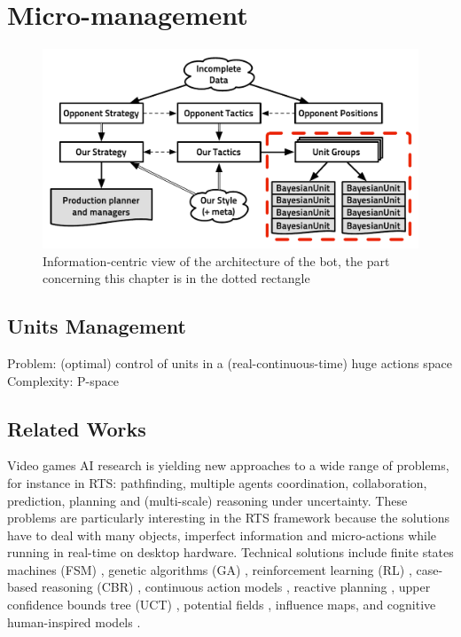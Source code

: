 \chapter{Micro-management}
\begin{figure}[!ht]
\begin{center}
\includegraphics[width=13cm]{images/starcraft_bbq_concept_MICRO.pdf}
\end{center}
\label{fig:conceptMICRO}
\caption{Information-centric view of the architecture of the bot, the part concerning this chapter is in the dotted rectangle}
\end{figure}

\section{Units Management}
Problem: (optimal) control of units in a (real-continuous-time) huge actions space
Complexity: P-space

\section{Related Works}

Video games AI research is yielding new approaches to a wide range of problems, for instance in RTS: pathfinding, multiple agents coordination, collaboration, prediction, planning and (multi-scale) reasoning under uncertainty. These problems are particularly interesting in the RTS framework because the solutions have to deal with many objects, imperfect information and micro-actions while running in real-time on desktop hardware. Technical solutions include finite states machines (FSM) \citep{FSM}, genetic algorithms (GA) \citep{GA,teamCompositionRTS}, reinforcement learning (RL) \citep{Marthi05concurrenthierarchical,Madeira06}, case-based reasoning (CBR) \citep{LTW,CBR-RL}, continuous action models \citep{Molineaux08}, reactive planning \citep{WeberCIG10}, upper confidence bounds tree (UCT) \citep{UCT}, potential fields \citep{Hagelback2009}, influence maps\citep{teamCompositionRTS}, and cognitive human-inspired models \citep{SORTS}.

